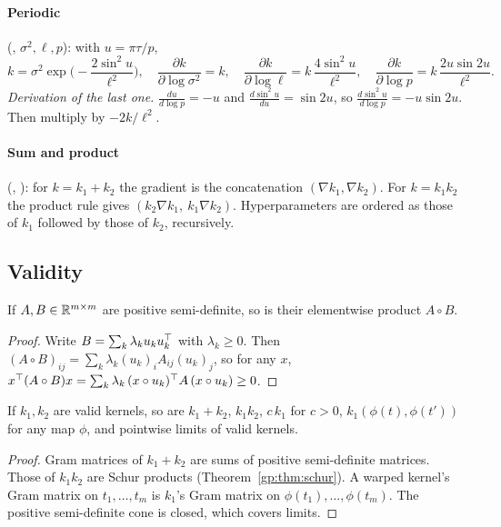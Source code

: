 \paragraph{Periodic} (, $\sigma^2,\ell,p$): with $u=\pi\tau/p$,
\[
  k=\sigma^2\exp\!\Big(-\frac{2\sin^2u}{\ell^2}\Big),\quad
  \frac{\partial k}{\partial\log\sigma^2}=k,\quad
  \frac{\partial k}{\partial\log\ell}=k\,\frac{4\sin^2u}{\ell^2},\quad
  \frac{\partial k}{\partial\log p}=k\,\frac{2u\sin 2u}{\ell^2}.
\]
\emph{Derivation of the last one.} $\frac{du}{d\log p}=-u$ and
$\frac{d\sin^2u}{du}=\sin2u$, so $\frac{d\sin^2u}{d\log p}=-u\sin2u$. Then
multiply by $-2k/\ell^2$.

\paragraph{Sum and product} (, ): for
$k=k_1+k_2$ the gradient is the concatenation $(\nabla k_1,\nabla k_2)$. For
$k=k_1k_2$ the product rule gives $(k_2\nabla k_1,\ k_1\nabla k_2)$.
Hyperparameters are ordered as those of $k_1$ followed by those of $k_2$, recursively.

\subsection{Validity}

\begin{theorem}\label{gp:thm:schur}
If $A,B\in\mathbb{R}^{m\times m}$ are positive semi-definite, so is their elementwise
product $A\circ B$.
\end{theorem}
\begin{proof}
Write $B=\sum_k\lambda_ku_ku_k^\top$ with $\lambda_k\ge0$. Then $(A\circ B)_{ij}=\sum_k\lambda_k(u_k)_iA_{ij}(u_k)_j$,
so for any $x$,
$x^\top(A\circ B)x=\sum_k\lambda_k\,(x\circ u_k)^\top A\,(x\circ u_k)\ge0$.
\end{proof}

\begin{corollary}\label{gp:cor:closure}
If $k_1,k_2$ are valid kernels, so are $k_1+k_2$, $k_1k_2$, $c\,k_1$ for $c>0$,
$k_1(\phi(t),\phi(t'))$ for any map $\phi$, and pointwise limits of valid kernels.
\end{corollary}
\begin{proof}
Gram matrices of $k_1+k_2$ are sums of positive semi-definite matrices. Those of $k_1k_2$ are Schur
products (Theorem~\ref{gp:thm:schur}). A warped kernel's Gram matrix on $t_1,\dots,t_m$ is $k_1$'s
Gram matrix on $\phi(t_1),\dots,\phi(t_m)$. The positive semi-definite cone is closed, which covers limits.
\end{proof}

